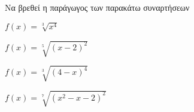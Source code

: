 Να βρεθεί η παράγωγος των παρακάτω συναρτήσεων
\begin{alist}
\item $ f(x)=\sqrt[3]{x^4} $
\item $ f(x)=\sqrt[5]{(x-2)^2} $
\item $ f(x)=\sqrt[3]{(4-x)^4} $
\item $ f(x)=\sqrt[7]{(x^2-x-2)^2} $
\end{alist}
